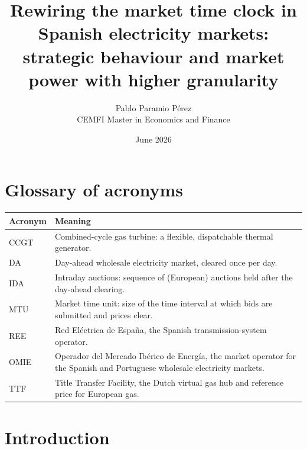 \documentclass[11pt,a4paper]{article}
\title{Rewiring the market time clock in Spanish electricity markets:\\
       strategic behaviour and market power with higher granularity}
\author{Pablo Paramio Pérez \\ CEMFI Master in Economics and Finance}
\date{June 2026}
\begin{document}
\maketitle

\begin{abstract}
\end{abstract}

\tableofcontents
\clearpage

\newpage
\section*{Glossary of acronyms}\label{sec:glossary}

\bigskip
\noindent
\renewcommand{\arraystretch}{1.25}
\begin{tabular}{@{}p{2.2cm} p{13cm}@{}}
\toprule
\textbf{Acronym} & \textbf{Meaning} \\
\midrule
CCGT & Combined-cycle gas turbine: a flexible, dispatchable thermal generator. \\
DA   & Day-ahead wholesale electricity market, cleared once per day. \\
IDA  & Intraday auctions: sequence of (European) auctions held after the day-ahead clearing. \\
MTU  & Market time unit: size of the time interval at which bids are submitted and prices clear. \\
REE  & Red Eléctrica de España, the Spanish transmission-system operator. \\
OMIE & Operador del Mercado Ibérico de Energía, the market operator for the Spanish and Portuguese wholesale electricity markets. \\
TTF & Title Transfer Facility, the Dutch virtual gas hub and reference price for European gas. \\
\bottomrule
\end{tabular}
\renewcommand{\arraystretch}{1.0}

\newpage

\section{Introduction}\label{sec:intro}
\end{document}
